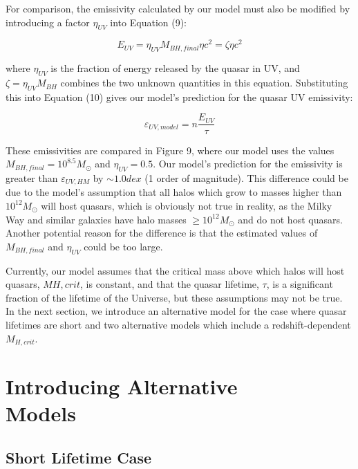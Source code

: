 \documentclass[12pt]{article}%
\begin{document}
\twocolumngrid


For comparison, the emissivity calculated by our model must also be modified by introducing a factor $\eta_{UV}$ into Equation (9):

\begin{equation}
    E_{UV}=\eta_{UV}M_{BH,final}\eta c^2=\zeta\eta c^2
\end{equation}

\noindent where $\eta_{UV}$ is the fraction of energy released by the quasar in UV, and $\zeta=\eta_{UV}M_{BH}$ combines the two unknown quantities in this equation. Substituting this into Equation (10) gives our model's prediction for the quasar UV emissivity:

\begin{equation}
    \varepsilon_{UV,model}=n\frac{E_{UV}}{\tau}
\end{equation}

\noindent These emissivities are compared in Figure 9, where our model uses the values $M_{BH,final}=10^{8.5}M_\odot$ and $\eta_{UV}=0.5$. Our model's prediction for the emissivity is greater than $\varepsilon_{UV,HM}$ by $\sim1.0dex$ (1 order of magnitude). This difference could be due to the model's assumption that all halos which grow to masses higher than $10^{12}M_\odot$ will host quasars, which is obviously not true in reality, as the Milky Way and similar galaxies have halo masses $\geq10^{12}M_\odot$ and do not host quasars. Another potential reason for the difference is that the estimated values of $M_{BH,final}$ and $\eta_{UV}$ could be too large.\par

Currently, our model assumes that the critical mass above which halos will host quasars, $M{H,crit}$, is constant, and that the quasar lifetime, $\tau$, is a significant fraction of the lifetime of the Universe, but these assumptions may not be true. In the next section, we introduce an alternative model for the case where quasar lifetimes are short and two alternative models which include a redshift-dependent $M_{H,crit}$.

\section{Introducing Alternative\\Models}

\subsection{Short Lifetime Case}
\end{document}
